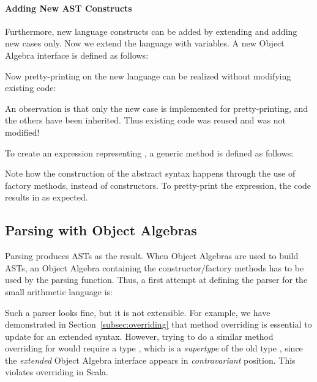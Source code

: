 
\paragraph{Adding New AST Constructs}
Furthermore, new language constructs can be added by extending  and adding new cases only. Now we extend the language
with variables. A new Object Algebra interface  is defined as follows:

Now pretty-printing on the new language can be realized without modifying existing code:

An observation is that only the new case is implemented for pretty-printing, and the others have been inherited.
Thus existing code was reused and was not modified!

To create an expression representing , a generic method is defined as follows:


Note how the construction of the abstract syntax happens through
the use of factory methods, instead of constructors.
To pretty-print the expression, the code 
results in  as expected.

\subsection{Parsing with Object Algebras}\label{subsec:parsingwithoa}

Parsing produces ASTs as the result. When Object Algebras are used
to build ASTs, an Object Algebra containing the constructor/factory
methods has to be used by the parsing function. Thus, a first attempt
at defining the parser for the small arithmetic language is:

Such a parser looks fine, but it is not extensible. For example, we have demonstrated in Section~\ref{subsec:overriding} that method overriding is essential to update  for an extended syntax. However, trying to do a similar method overriding for  would require a type  , which is a \emph{supertype} of the old type  , since
the \emph{extended} Object Algebra interface appears in \emph{contravariant} position. This violates
overriding in Scala.


